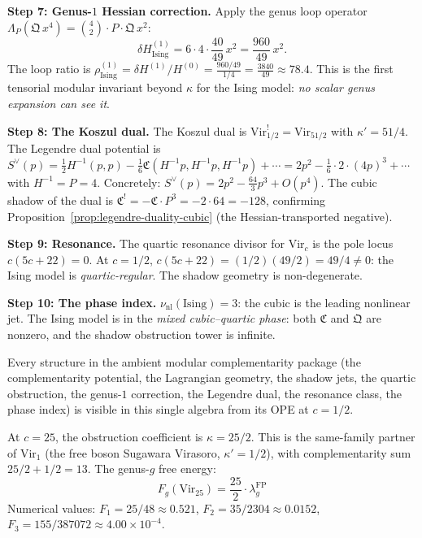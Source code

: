 \begin{computation}
\medskip\noindent\textbf{Step 7: Genus-$1$ Hessian correction.}
Apply the genus loop operator
$\Lambda_P(\mathfrak{Q}\,x^4) = \binom{4}{2}\cdot P \cdot
\mathfrak{Q}\,x^2$:
\begin{equation}\label{eq:ising-genus1-hessian}
\delta H^{(1)}_{\mathrm{Ising}}
= 6 \cdot 4 \cdot \frac{40}{49}\,x^2
= \frac{960}{49}\,x^2.
\end{equation}
The loop ratio is
$\rho^{(1)}_{\mathrm{Ising}}
= \delta H^{(1)}/H^{(0)}
= \frac{960/49}{1/4}
= \frac{3840}{49}
\approx 78.4$.
This is the first tensorial modular invariant beyond $\kappa$
for the Ising model: \emph{no scalar genus expansion can see it}.

\medskip\noindent\textbf{Step 8: The Koszul dual.}
The Koszul dual is $\mathrm{Vir}_{1/2}^! = \mathrm{Vir}_{51/2}$
with $\kappa' = 51/4$. The Legendre dual potential is
$S^{\vee}(p) = \frac{1}{2}H^{-1}(p,p)
- \frac{1}{6}\mathfrak{C}(H^{-1}p, H^{-1}p, H^{-1}p) + \cdots
= 2p^2 - \tfrac{1}{6}\cdot 2 \cdot(4p)^3 + \cdots$
with $H^{-1} = P = 4$. Concretely:
$S^{\vee}(p) = 2p^2 - \frac{64}{3}p^3 + O(p^4)$.
The cubic shadow of the dual is
$\mathfrak{C}^! = -\mathfrak{C} \cdot P^3
= -2 \cdot 64 = -128$,
confirming Proposition~\ref{prop:legendre-duality-cubic} (the Hessian-transported negative).

\medskip\noindent\textbf{Step 9: Resonance.}
The quartic resonance divisor for $\mathrm{Vir}_c$ is the pole
locus $c(5c+22) = 0$. At $c = 1/2$, $c(5c+22) = (1/2)(49/2)
= 49/4 \neq 0$: the Ising model is \emph{quartic-regular}.
The shadow geometry is non-degenerate.

\medskip\noindent\textbf{Step 10: The phase index.}
$\nu_{\mathrm{nl}}(\mathrm{Ising}) = 3$: the cubic is the
leading nonlinear jet. The Ising model is in the
\emph{mixed cubic--quartic phase}: both $\mathfrak{C}$ and
$\mathfrak{Q}$ are nonzero, and the shadow obstruction tower is infinite.

\medskip
Every structure in the ambient modular complementarity package
(the complementarity potential, the Lagrangian geometry, the
shadow jets, the quartic obstruction, the genus-$1$ correction,
the Legendre dual, the resonance class, the phase index) is
visible in this single algebra from its OPE at $c = 1/2$.
\end{computation}

\begin{computation}[Virasoro at \texorpdfstring{$c = 25$}{c = 25}]

\label{comp:vir-c25-genera}
At $c = 25$, the obstruction coefficient is
$\kappa = 25/2$. This is the same-family partner of
$\mathrm{Vir}_1$ (the free boson Sugawara Virasoro,
$\kappa' = 1/2$), with complementarity sum
$25/2 + 1/2 = 13$. The genus-$g$ free energy:
\[
F_g(\mathrm{Vir}_{25}) = \frac{25}{2}
\cdot \lambda_g^{\mathrm{FP}}
\]
Numerical values:
$F_1 = 25/48 \approx 0.521$,
$F_2 = 35/2304 \approx 0.0152$,
$F_3 = 155/387072 \approx 4.00 \times 10^{-4}$.
\end{computation}


